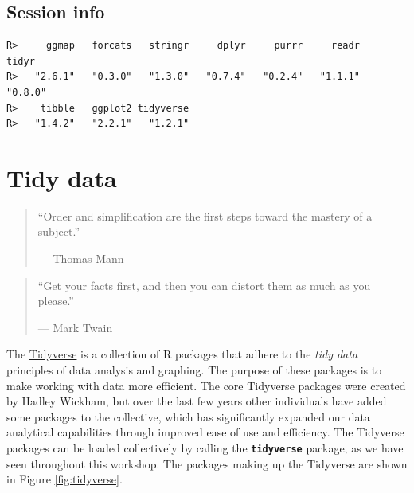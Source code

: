 \documentclass[]{book}
\newenvironment{Shaded}{\begin{snugshade}}{\end{snugshade}}
\newcommand{\KeywordTok}[1]{\textcolor[rgb]{0.13,0.29,0.53}{\textbf{#1}}}
\newcommand{\StringTok}[1]{\textcolor[rgb]{0.31,0.60,0.02}{#1}}
\newcommand{\OperatorTok}[1]{\textcolor[rgb]{0.81,0.36,0.00}{\textbf{#1}}}
\newcommand{\NormalTok}[1]{#1}
\theoremstyle{definition}
\theoremstyle{definition}
\theoremstyle{definition}
\theoremstyle{remark}
\begin{document}
\section{Session info}\label{session-info-8}

\begin{Shaded}
\end{Shaded}

\begin{verbatim}
R>     ggmap   forcats   stringr     dplyr     purrr     readr     tidyr 
R>   "2.6.1"   "0.3.0"   "1.3.0"   "0.7.4"   "0.2.4"   "1.1.1"   "0.8.0" 
R>    tibble   ggplot2 tidyverse 
R>   "1.4.2"   "2.2.1"   "1.2.1"
\end{verbatim}

\chapter{Tidy data}\label{tidy}

\begin{quote}
``Order and simplification are the first steps toward the mastery of a
subject.''

--- Thomas Mann
\end{quote}

\begin{quote}
``Get your facts first, and then you can distort them as much as you
please.''

--- Mark Twain
\end{quote}

The \href{http://tidyverse.org}{Tidyverse} is a collection of R packages
that adhere to the \emph{tidy data} principles of data analysis and
graphing. The purpose of these packages is to make working with data
more efficient. The core Tidyverse packages were created by Hadley
Wickham, but over the last few years other individuals have added some
packages to the collective, which has significantly expanded our data
analytical capabilities through improved ease of use and efficiency. The
Tidyverse packages can be loaded collectively by calling the
\textbf{\texttt{tidyverse}} package, as we have seen throughout this
workshop. The packages making up the Tidyverse are shown in Figure
\ref{fig:tidyverse}.
\end{document}
